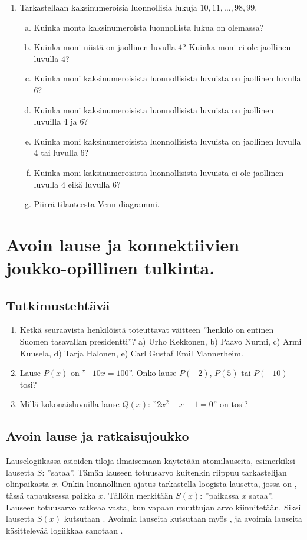 \begin{enumerate}
\item Tarkastellaan kaksinumeroisia luonnollisia lukuja $10, 11, \ldots, 98, 99$.
\begin{enumerate}[a)]
\item Kuinka monta kaksinumeroista luonnollista lukua on olemassa?
\item Kuinka moni niistä on jaollinen luvulla $4$? Kuinka moni ei ole jaollinen luvulla $4$?
\item Kuinka moni kaksinumeroisista luonnollisista luvuista on jaollinen luvulla $6$?
\item Kuinka moni kaksinumeroisista luonnollisista luvuista on jaollinen luvuilla $4$ ja $6$?
\item Kuinka moni kaksinumeroisista luonnollisista luvuista on jaollinen luvulla $4$ tai luvulla $6$?
\item Kuinka moni kaksinumeroisista luonnollisista luvuista ei ole jaollinen luvulla $4$ eikä luvulla $6$?
\item Piirrä tilanteesta Venn-diagrammi.
\end{enumerate}

\end{enumerate}

\newpage


\section{Avoin lause ja konnektiivien joukko-opillinen tulkinta.}

\subsection*{Tutkimustehtävä}
\begin{enumerate}
\item Ketkä seuraavista henkilöistä toteuttavat väitteen ''henkilö on entinen Suomen tasavallan presidentti''? 
a) Urho Kekkonen,  b)  Paavo Nurmi,  c)  Armi Kuusela,  d)  Tarja Halonen,  
e) Carl Gustaf Emil Mannerheim.
\item
Lause $P(x)$ on ''$-10x = 100$''. Onko lause $P(-2)$, $P(5)$ tai $P(-10)$ tosi?
\item
Millä kokonaisluvuilla lause $Q(x)$: ''$2x^2 - x - 1 = 0$'' on tosi?
\end{enumerate}

\subsection*{Avoin lause ja ratkaisujoukko}
Lauselogiikassa asioiden tiloja ilmaisemaan käytetään atomilauseita, esimerkiksi lausetta $S$: ''sataa''. Tämän lauseen totuusarvo kuitenkin riippuu tarkastelijan olinpaikasta $x$. Onkin luonnollinen ajatus tarkastella loogista lausetta, jossa on , tässä tapauksessa paikka $x$. Tällöin merkitään $S(x)$: ''paikassa $x$ sataa''. Lauseen totuusarvo ratkeaa vasta, kun vapaan muuttujan arvo kiinnitetään. Siksi lausetta $S(x)$ kutsutaan . Avoimia lauseita kutsutaan myös , ja avoimia lauseita käsittelevää logiikkaa sanotaan .

